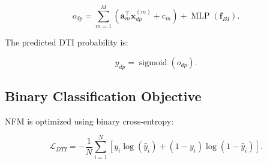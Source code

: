 \begin{equation}
    o_{dp}
    =
    \sum_{m=1}^{M}
    \left(
        \mathbf{a}_{m}^{\top}\mathbf{x}_{dp}^{(m)}+c_m
    \right)
    +
    \operatorname{MLP}(\mathbf{f}_{BI}).
\end{equation}

The predicted DTI probability is:

\begin{equation}
    \hat{y}_{dp}=\operatorname{sigmoid}(o_{dp}).
\end{equation}

\subsection{Binary Classification Objective}

NFM is optimized using binary cross-entropy:

\begin{equation}
    \mathcal{L}_{DTI}
    =
    -\frac{1}{N}
    \sum_{i=1}^{N}
    \left[
        y_i\log(\hat{y}_i)
        +(1-y_i)\log(1-\hat{y}_i)
    \right].
\end{equation}

